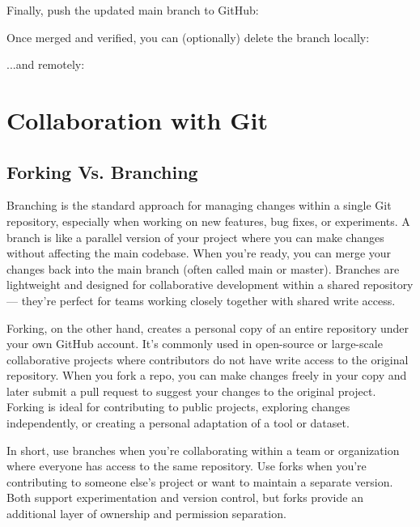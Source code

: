 Finally, push the updated main branch to GitHub:
\begin{terminal}
\end{terminal}

Once merged and verified, you can (optionally) delete the branch locally:
\begin{terminal}
\end{terminal}

...and remotely:
\begin{terminal}
\end{terminal}

\section{Collaboration with Git}
\subsection*{Forking Vs. Branching}
Branching is the standard approach for managing changes within a single Git repository, especially when working on new features, bug fixes, or experiments. A branch is like a parallel version of your project where you can make changes without affecting the main codebase. When you're ready, you can merge your changes back into the main branch (often called main or master). Branches are lightweight and designed for collaborative development within a shared repository --- they're perfect for teams working closely together with shared write access.

Forking, on the other hand, creates a personal copy of an entire repository under your own GitHub account. It’s commonly used in open-source or large-scale collaborative projects where contributors do not have write access to the original repository. When you fork a repo, you can make changes freely in your copy and later submit a pull request to suggest your changes to the original project. Forking is ideal for contributing to public projects, exploring changes independently, or creating a personal adaptation of a tool or dataset.

In short, use branches when you're collaborating within a team or organization where everyone has access to the same repository. Use forks when you’re contributing to someone else’s project or want to maintain a separate version. Both support experimentation and version control, but forks provide an additional layer of ownership and permission separation.


